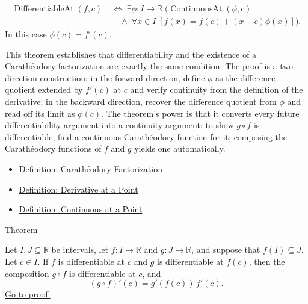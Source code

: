 \begin{remark*}
\begin{align*}
\operatorname{DifferentiableAt}(f,c)
\;&\iff\;
\exists\phi:I\to\mathbb{R}\;
\bigl(\operatorname{ContinuousAt}(\phi,c)\\
&\quad\land\;\forall x \in I\;[f(x)=f(c)+(x-c)\phi(x)]\bigr).
\end{align*}
In this case $\phi(c) = f'(c)$.
\end{remark*}

\begin{remark*}[Interpretation]
This theorem establishes that differentiability and the existence of a Carathéodory factorization are exactly the same condition. The proof is a two-direction construction: in the forward direction, define $\phi$ as the difference quotient extended by $f'(c)$ at $c$ and verify continuity from the definition of the derivative; in the backward direction, recover the difference quotient from $\phi$ and read off its limit as $\phi(c)$. The theorem's power is that it converts every future differentiability argument into a continuity argument: to show $g \circ f$ is differentiable, find a continuous Carathéodory function for it; composing the Carathéodory functions of $f$ and $g$ yields one automatically.
\end{remark*}

\begin{remark*}[Dependencies]
\begin{itemize}
  \item \hyperref[def:caratheodory-factorization]{Definition: Carathéodory Factorization}
  \item \hyperref[def:derivative-at-a-point]{Definition: Derivative at a Point}
  \item \hyperref[def:continuous-at]{Definition: Continuous at a Point}
\end{itemize}
\end{remark*}


\begin{theorembox}{Theorem}
\begin{theorem}
\label{thm:chain-rule}
Let $I, J \subseteq \mathbb{R}$ be intervals, let $f : I \to \mathbb{R}$ and $g : J \to \mathbb{R}$, and suppose that $f(I) \subseteq J$. Let $c \in I$. If $f$ is differentiable at $c$ and $g$ is differentiable at $f(c)$, then the composition $g \circ f$ is differentiable at $c$, and
\[
(g \circ f)'(c) = g'(f(c))\,f'(c).
\]
\hyperref[prf:chain-rule]{Go to proof.}
\end{theorem}
\end{theorembox}

